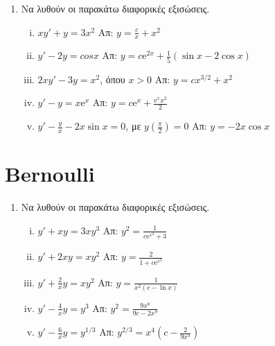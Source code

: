 \begin{enumerate}
  \item Να λυθούν οι παρακάτω διαφορικές εξισώσεις.
    \begin{enumerate}[i)]
      \item $ xy'+y=3x^{2} $ \hfill Απ: $ y= \frac{c}{x} + x^{2} $  
      \item $ y'-2y= cosx $ \hfill Απ: $ y=c \mathrm{e}^{2x} + \frac{1}{5} (\sin{x}
        - 2 \cos{x}) $  
      \item $ 2xy'-3y=x^{2} $, όπου $ x>0 $ \hfill Απ: $ y=cx^{3/2} +x^{2} $ 
      \item $ y'-y=x \mathrm{e}^{x} $ \hfill Απ: $ y=c \mathrm{e}^{x} +
        \frac{\mathrm{e}^{x} x^{2}}{2} $ 
      \item $ y'- \frac{y}{x} -2x \sin{x} = 0 $, με $ y(\frac{\pi}{2}) = 0 $
        \hfill Απ: $ y=-2x \cos{x} $  
        \end{enumerate}
\end{enumerate}


\section*{Bernoulli}

\begin{enumerate}
  \item Να λυθούν οι παρακάτω διαφορικές εξισώσεις.
    \begin{enumerate}[i)]
      \item $ y'+xy=3xy^3$ \hfill Απ: $y^2= \frac{1}{c \mathrm{e}^{x^{2}} +3} $  
      \item $ y'+2xy=xy^2$ \hfill Απ: $y= \frac{2}{1+c \mathrm{e}^{x^2}}$  
      \item $ y'+ \frac{2}{x} y = xy^2$ \hfill Απ: $y= \frac{1}{x^{2}(c- \ln{x})} $ 
      \item $y'- \frac{4}{x} y = y^3$ \hfill Απ: $y^2= \frac{9x^8}{9c-2x^9} $ 
      \item $y'- \frac{6}{x} y = y^{1/3} $ \hfill Απ: $y^{2/3}=x^4(c- \frac{2}{9x^3})$
        \end{enumerate}
\end{enumerate}



